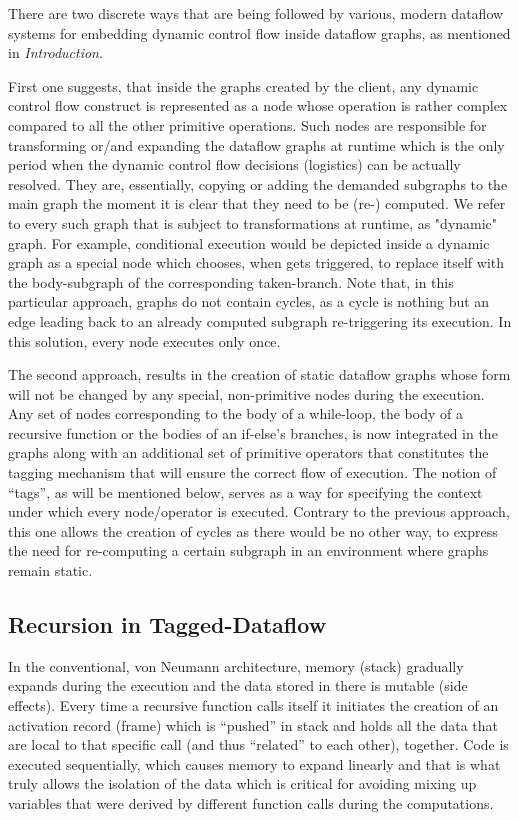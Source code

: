 \documentclass[ack,preface]{dithesis}
\begin{document}
There are two discrete ways that are being followed by various, modern dataflow systems for embedding dynamic control flow inside dataflow graphs, as mentioned in \textit{Introduction}. 

First one suggests, that inside the graphs created by the client, any dynamic control flow construct is represented as a node whose operation is rather complex compared to all the other primitive operations. Such nodes are responsible for transforming or/and expanding the dataflow graphs at runtime which is the only period when the dynamic control flow decisions (logistics) can be actually resolved. They are, essentially, copying or adding the demanded subgraphs to the main graph the moment it is clear that they need to be (re-) computed. We refer to every such graph that is subject to transformations at runtime, as "dynamic" graph.  For example, conditional execution would be depicted inside a dynamic graph as a special node which chooses, when gets triggered, to replace itself with the body-subgraph of the corresponding taken-branch.
Note that, in this particular approach, graphs do not contain cycles, as a cycle is nothing but an edge leading back to an already computed subgraph re-triggering its execution. In this solution, every node executes only once. 

The second approach, results in the creation of static dataflow graphs whose form will not be changed by any special, non-primitive nodes during the execution. Any set of nodes corresponding to the body of a while-loop, the body of a recursive function or the bodies of an if-else’s branches, is now integrated in the graphs along with an additional set of primitive operators that constitutes the tagging mechanism that will ensure the correct flow of execution. The notion of “tags”, as will be mentioned below, serves as a way for specifying the context under which every node/operator is executed. Contrary to the previous approach, this one allows the creation of cycles as there would be no other way, to express the need for re-computing a certain subgraph in an environment where graphs remain static. 

    \subsection{Recursion in Tagged-Dataflow}

In the conventional, von Neumann architecture, memory (stack) gradually expands during the execution and the data stored in there is mutable (side effects). 
Every time a  recursive function calls itself it initiates the creation of an activation record (frame) which is “pushed” in stack and holds all the data that are local to that specific call (and thus “related” to each other), together. Code is executed sequentially, which causes memory to expand linearly and that is what truly allows the isolation of the data which is critical for avoiding mixing up variables that were derived by different function calls during the computations.
\end{document}
